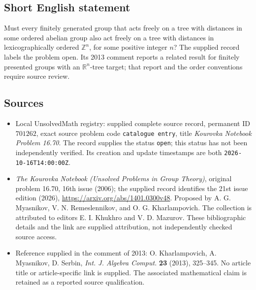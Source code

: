 \documentclass[11pt]{article}
\newcommand{\Z}{\mathbb{Z}}
\newcommand{\R}{\mathbb{R}}
\begin{document}
\subsection{Short English statement}
Must every finitely generated group that acts freely on a tree with distances in some ordered abelian group also act freely on a tree with distances in lexicographically ordered \(\Z^n\), for some positive integer \(n\)? The supplied record labels the problem open. Its 2013 comment reports a related result for finitely presented groups with an \(\R^n\)-tree target; that report and the order conventions require source review.
\subsection{Sources}
\begin{itemize}
\item Local UnsolvedMath registry: supplied complete source record, permanent ID \(701262\), exact source problem code \texttt{catalogue entry}, title \emph{Kourovka Notebook Problem 16.70}. The record supplies the status \texttt{open}; this status has not been independently verified. Its creation and update timestamps are both \texttt{2026-10-16T14:00:00Z}.
\item \emph{The Kourovka Notebook (Unsolved Problems in Group Theory)}, original problem 16.70, 16th issue (2006); the supplied record identifies the 21st issue edition (2026), \url{https://arxiv.org/abs/1401.0300v48}. Proposed by A. G. Myasnikov, V. N. Remeslennikov, and O. G. Kharlampovich. The collection is attributed to editors E. I. Khukhro and V. D. Mazurov. These bibliographic details and the link are supplied attribution, not independently checked source access.
\item Reference supplied in the comment of 2013: O. Kharlampovich, A. Myasnikov, D. Serbin, \emph{Int. J. Algebra Comput.} \textbf{23} (2013), 325--345. No article title or article-specific link is supplied. The associated mathematical claim is retained as a reported source qualification.
\end{itemize}
\end{document}
